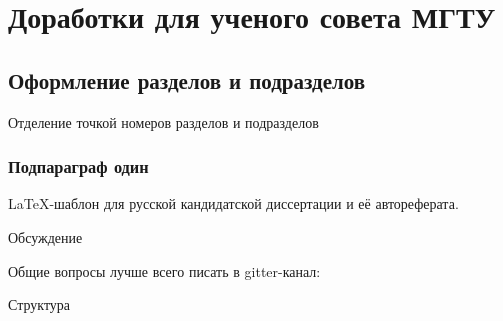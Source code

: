 \chapter{Доработки для ученого совета МГТУ}\label{ch:ch4}

\section{Оформление разделов и подразделов}\label{sec:ch4/sect1}

Отделение точкой номеров разделов и подразделов



\subsection{Подпараграф \cyrdash{} один}\label{subsec:ch4/sect4/sub1}




LaTeX-шаблон для русской кандидатской диссертации и её автореферата.





Обсуждение

Общие вопросы лучше всего писать в gitter-канал:


 Структура

